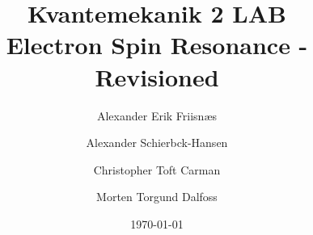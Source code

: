 \documentclass[a4paper,%
               reprint,%
               aps,%
               prl,%
               amsfonts,%
               amssymb,%
               amsmath,%
               nobibnotes,%
               twoside,%
               balancelastpage,%
               eqsecnum]%
               {revtex4-1}
\begin{document}
\title{Kvantemekanik 2 LAB\\Electron Spin Resonance - Revisioned}
\date{\today}
\author{Alexander Erik Friisnæs}
\author{Alexander Schierbck-Hansen}
\author{Christopher Toft Carman}  
\author{Morten Torgund Dalfoss}  

\begin{abstract} 

\end{abstract}
\maketitle
\end{document}
